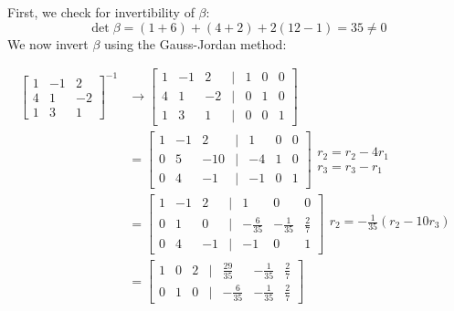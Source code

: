 \documentclass[12pt]{article}
\begin{document}
\begin{enumerate}
        First, we check for invertibility of $\beta$:
        \[ \det \beta = (1+6)+(4+2) +2(12-1) = 35 \neq 0\]
        We now invert $\beta$ using the Gauss-Jordan method:
        
        \begin{align*}
            \begin{bmatrix}
                1&-1&2 \\ 4&1&-2 \\ 1&3&1
                \end{bmatrix}^{-1} 
            &\to \begin{bmatrix}
                    1&-1&2 &|& 1&0&0 
                    \\ 4&1&-2  &|& 0&1&0
                    \\ 1&3&1 &|& 0&0&1
                \end{bmatrix}
            \\ &= \begin{bmatrix}
                    1&-1&2 &|& 1&0&0 
                    \\ 0&5&-10 &|& -4&1&0
                    \\ 0&4&-1 &|& -1&0&1
                \end{bmatrix}\begin{matrix}
                    \\ r_2 = r_2 - 4r_1
                    \\ r_3=r_3-r_1
                    \\ 
                \end{matrix}
            \\ &= \begin{bmatrix}
                    1&-1&2 &|& 1&0&0 
                    \\ 0&1&0 &|& -\frac{6}{35}&-\frac{1}{35}&\frac{2}{7}
                    \\ 0&4&-1 &|& -1&0&1
                \end{bmatrix}\begin{matrix}
                    \\ r_2 = -\frac{1}{35}(r_2 -10r_3)
                    \\ %
                    \\ 
                \end{matrix}
            \\ &= \begin{bmatrix}
                    1&0&2 &|& \frac{29}{35}&-\frac{1}{35}&\frac{2}{7}
                    \\ 0&1&0 &|& -\frac{6}{35}&-\frac{1}{35}&\frac{2}{7}

\end{bmatrix}
\end{align*}
\end{enumerate}
\end{document}

